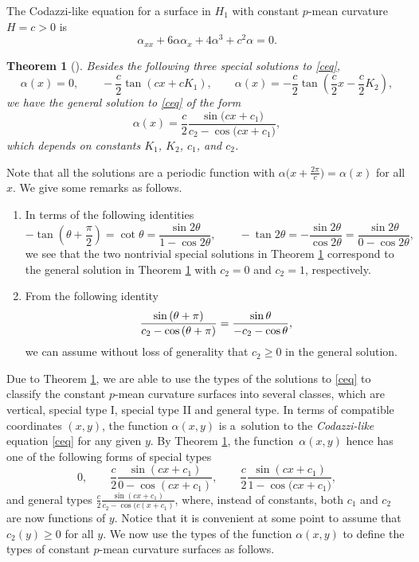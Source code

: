 \documentclass[pdftex]{sigma}
\numberwithin{equation}{section}
\newtheorem{Theorem}{Theorem}[section]
\begin{document}
The Codazzi-like equation for a surface in $H_1$ with constant $p$-mean
curvature $H=c>0$ is
\begin{equation} \label{ceq}
\alpha_{xx}+6\alpha \alpha_{x}+4\alpha^{3}+c^2\alpha=0.
\end{equation}

\begin{Theorem}[\cite{ChiuH/LiuH:2022}]
\label{consta1} Besides the following three special solutions to \eqref{ceq},
\[
\alpha(x)=0,\qquad -\frac{c}{2}\tan(cx+cK_1),\qquad \alpha(x)=-\frac{c}{2}\tan\left(\frac{c%
}{2}x-\frac{c}{2}K_2\right),
\]
we have the general solution to \eqref{ceq} of the form
\begin{equation*}
\alpha(x)=\frac{c}{2}\frac{\sin{\bigl(cx+c_{1}\bigr)}}{c_{2}-\cos{\bigl(cx+c_{1}%
\bigr)}},
\end{equation*}
which depends on constants $K_{1}$, $K_{2}$, $c_1$, and $c_2$.
\end{Theorem}

Note that all the solutions are a periodic function with $\alpha\bigl(x+\frac{2\pi%
}{c}\bigr)=\alpha(x)$ for all $x$. We give some remarks as follows.
\begin{enumerate}\itemsep=0pt
\item[(1)] In terms of the following identities
\begin{equation*}
-\tan{\left(\theta+\frac{\pi}{2}\right)}=\cot{\theta}=\frac{\sin{2\theta}}{1-\cos{2\theta}},\qquad
-\tan{2\theta}=-\frac{\sin{2\theta}}{\cos{2\theta}}=\frac{\sin{2\theta}}{0-\cos{2\theta}},
\end{equation*}
we see that the two nontrivial special solutions in Theorem \ref{consta1}
correspond to the general solution in Theorem \ref{consta1} with $c_{2}=0$ and $c_{2}=1$, respectively.
\item[(2)] From the following identity
\[
\frac{\sin{(\theta+\pi)}}{c_{2}-\cos{(\theta+\pi)}}=\frac{\sin{\theta}}{%
-c_{2}-\cos{\theta}},
\]
we can assume without loss of generality that $c_{2}\geq 0$ in the general
solution.
\end{enumerate}



Due to Theorem \ref{consta1}, we are able to use the types of the solutions
to \eqref{ceq} to classify the constant $p$-mean curvature surfaces into
several classes, which are vertical, special type I, special type II and
general type. In terms of compatible coordinates $(x,y)$, the function $\alpha(x,y)$ is a~solution to the \emph{Codazzi-like} equation \eqref{ceq}
for any given $y$. By Theorem \ref{consta1}, the function~$\alpha(x,y)$
hence has one of the following forms of special types
\[
0,\qquad \frac{c}{2}\frac{\sin(cx+c_1)}{0-\cos(cx+c_1)},\qquad
\frac{c}{2}\frac{\sin{(cx+c_{1})}}{1-\cos{\bigl(cx+c_{1})}},
\]
and general types
$
\frac{c}{2}\frac{\sin{(cx+c_{1})}}{c_{2}-\cos{(c(x+c_{1})}}$,
where, instead of constants, both $c_{1}$ and $c_{2}$ are now functions of $%
y $. Notice that it is convenient at some point to assume that $c_{2}(y)\geq0$ for all $y$. We now use the types of the
function $\alpha(x,y)$ to define the types of constant $p$-mean curvature
surfaces as follows.
\end{document}
